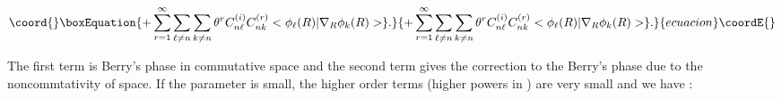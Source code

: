 \documentclass[a4paper,a4paper]{article}
\begin{document}
\coordHE{}\\

\coordHE{}

\begin{equation}\coord{}\boxEquation{
+ \sum_{r=1}^{\infty}\sum_{\ell\neq
n}\sum_{k\neq
n}\theta^{r} C_{n\ell}^{(i)}C_{nk}^{(r)}<\phi_{\ell}(R)|
\nabla_{R}\phi_{k}(R)>\} .
}{
+ \sum_{r=1}^{\infty}\sum_{\ell\neq
n}\sum_{k\neq
n}\theta^{r} C_{n\ell}^{(i)}C_{nk}^{(r)}<\phi_{\ell}(R)|
\nabla_{R}\phi_{k}(R)>\} .
}{ecuacion}\coordE{}\end{equation}

The first term is Berry's phase in commutative space and the
second term gives the correction to the Berry's phase due to the
noncommtativity of space. If the parameter \myHighlight{$\theta$}\coordHE{} is small, the higher
order
terms (higher powers in \myHighlight{$\theta$}\coordHE{}) are very small and we have : \\

\coordHE{}
\end{document}
